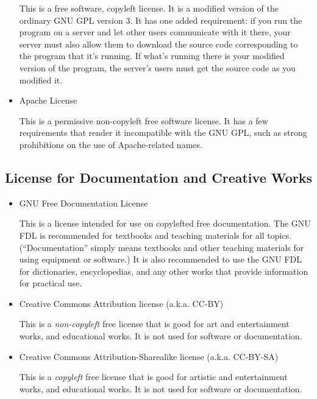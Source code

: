 \begin{itemize}
This is a free software, copyleft license. It is a modified version of the ordinary GNU GPL version 3. It has one added requirement: if you run the program on a server and let other users communicate with it there, your server must also allow them to download the source code corresponding to the program that it's running. If what's running there is your modified version of the program, the server's users must get the source code as you modified it.

\item Apache License

This is a permissive non-copyleft free software license. It has a few requirements that render it incompatible with the GNU GPL, such as strong prohibitions on the use of Apache-related names.
\end{itemize}
\subsection{License for Documentation and Creative Works}
\begin{itemize}
\item GNU Free Documentation License

This is a license intended for use on copylefted free documentation. The GNU FDL is recommended for textbooks and teaching materials for all topics. (``Documentation'' simply means textbooks and other teaching materials for using equipment or software.) It is also recommended to use the GNU FDL for dictionaries, encyclopedias, and any other works that provide information for practical use.
\item Creative Commons Attribution license (a.k.a. CC-BY)

This is a \emph{non-copyleft} free license that is good for art and entertainment works, and educational works. It is not used for software or documentation.

\item Creative Commons Attribution-Sharealike license (a.k.a. CC-BY-SA)

This is a \emph{copyleft} free license that is good for artistic and entertainment works, and educational works. It is not used for software or documentation.
\end{itemize}
